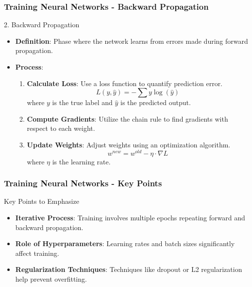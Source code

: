 \documentclass[aspectratio=169]{beamer}
\begin{document}
\begin{frame}[fragile]
    \frametitle{Training Neural Networks - Backward Propagation}
    \begin{block}{2. Backward Propagation}
        \begin{itemize}
            \item \textbf{Definition}: Phase where the network learns from errors made during forward propagation.
            \item \textbf{Process}:
            \begin{enumerate}
                \item \textbf{Calculate Loss}: Use a loss function to quantify prediction error.
                \begin{equation}
                    L(y, \hat{y}) = -\sum{y \log(\hat{y})}
                \end{equation}
                where \( y \) is the true label and \( \hat{y} \) is the predicted output.
                \item \textbf{Compute Gradients}: Utilize the chain rule to find gradients with respect to each weight.
                \item \textbf{Update Weights}: Adjust weights using an optimization algorithm.
                \begin{equation}
                    w^{new} = w^{old} - \eta \cdot \nabla L
                \end{equation}
                where \( \eta \) is the learning rate.
            \end{enumerate}
        \end{itemize}
    \end{block}
\end{frame}

\begin{frame}[fragile]
    \frametitle{Training Neural Networks - Key Points}
    \begin{block}{Key Points to Emphasize}
        \begin{itemize}
            \item \textbf{Iterative Process}: Training involves multiple epochs repeating forward and backward propagation.
            \item \textbf{Role of Hyperparameters}: Learning rates and batch sizes significantly affect training.
            \item \textbf{Regularization Techniques}: Techniques like dropout or L2 regularization help prevent overfitting.
        \end{itemize}
    \end{block}
\end{frame}
\end{document}

